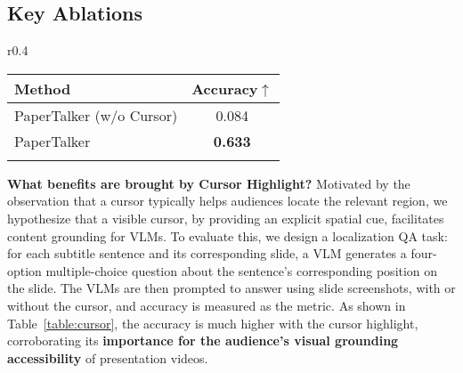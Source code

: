 \subsection{Key Ablations}
\vspace{-0.4\baselineskip} 
\begin{wraptable}[3]{r}{0.4\textwidth} %
  \vspace{-2\baselineskip}               %
  \tablesize
  \centering
    \caption{\textbf{Ablation study on cursor.}}
  \begin{tabular}{lc}
    \toprule
    Method & Accuracy$\uparrow$ \\
    \midrule
    PaperTalker (w/o Cursor) &  0.084 \\
    PaperTalker &\textbf{0.633} \\
    \bottomrule
    \label{table:cursor}
  \end{tabular}
\end{wraptable}
\noindent\textbf{What benefits are brought by Cursor Highlight?} 
Motivated by the observation that a cursor typically helps audiences locate the relevant region, we hypothesize that a visible cursor, by providing an explicit spatial cue, facilitates content grounding for VLMs. To evaluate this, we design a localization QA task: for each subtitle sentence and its corresponding slide, a VLM generates a four-option multiple-choice question about the sentence’s corresponding position on the slide. The VLMs are then prompted to answer using slide screenshots, with or without the cursor, and accuracy is measured as the metric. As shown in Table~\ref{table:cursor}, the accuracy is much higher with the cursor highlight, corroborating its \textbf{importance for the audience's visual grounding accessibility} of presentation videos. 

